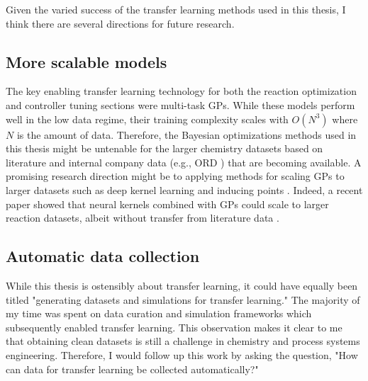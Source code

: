 Given the varied success of the transfer learning methods used in this thesis, I think there are several directions for future research.

\subsection{More scalable models}

 The key enabling transfer learning technology for both the reaction optimization and controller tuning sections were multi-task GPs. While these models perform well in the low data regime, their training complexity scales with $O(N^3)$ where $N$ is the amount of data. Therefore, the Bayesian optimizations methods used in this thesis might be untenable for the larger chemistry datasets based on literature and internal company data (e.g., ORD \cite{ord}) that are becoming available. A promising research direction might be to applying methods for scaling GPs to larger datasets such as deep kernel learning\cite{Wilson2016} and inducing points \cite{Quinonero2005}. Indeed, a recent paper showed that neural kernels combined with GPs could scale to larger reaction datasets, albeit without transfer from literature data \cite{Angello2022}.


\subsection{Automatic data collection}

While this thesis is ostensibly about transfer learning, it could have equally been titled "generating datasets and simulations for transfer learning." The majority of my time was spent on data curation and simulation frameworks which subsequently enabled transfer learning.  This observation makes it clear to me that obtaining clean datasets is still a challenge in chemistry and process systems engineering. Therefore, I would follow up this work by asking the question, "How can data for transfer learning be collected automatically?"

